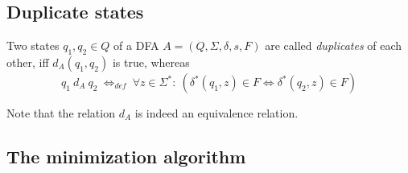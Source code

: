 \subsection{Duplicate states}

\begin{definition}\cite[p. 154]{hopcroft01}
	Two states $q_1, q_2 \in Q$ of a DFA $A = (Q, \Sigma, \delta, s, F)$ are called \emph{duplicates} of each other, iff $d_A(q_1, q_2)$ is true, whereas
	\begin{displaymath}
	q_1\ d_A\ q_2\ \Leftrightarrow_{def}\ \forall z \in \Sigma^* \colon\ (\delta^*(q_1, z) \in F \Leftrightarrow \delta^*(q_2, z) \in F)
	\end{displaymath}
\end{definition}
\noindent Note that the relation $d_A$ is indeed an equivalence relation.

\subsection{The minimization algorithm}

